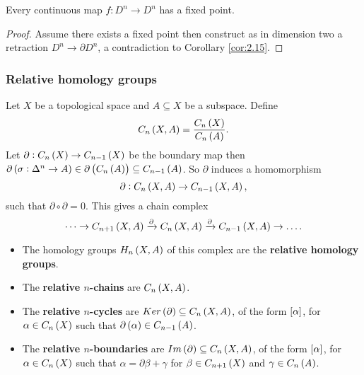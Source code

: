 \begin{theorem}
Every continuous map $ f : D^n \to D^n $ has a fixed point.
\end{theorem}

\begin{proof}
Assume there exists a fixed point then construct as in dimension two a retraction $ D^n \to \partial D^n $, a contradiction to Corollary \ref{cor:2.15}.
\end{proof}

\subsubsection{Relative homology groups}

Let $ X $ be a topological space and $ A \subseteq X $ be a subspace. Define
$$ C_n\br{X, A} = \dfrac{C_n\br{X}}{C_n\br{A}}. $$
Let $ \partial : C_n\br{X} \to C_{n - 1}\br{X} $ be the boundary map then $ \partial\br{\sigma : \Delta^n \to A} \in \partial\br{C_n\br{A}} \subseteq C_{n - 1}\br{A} $. So $ \partial $ induces a homomorphism
$$ \partial : C_n\br{X, A} \to C_{n - 1}\br{X, A}, $$
such that $ \partial \circ \partial = 0 $. This gives a chain complex
$$ \dots \to C_{n + 1}\br{X, A} \xrightarrow{\partial} C_n\br{X, A} \xrightarrow{\partial} C_{n - 1}\br{X, A} \to \dots. $$
\begin{itemize}
\item The homology groups $ H_n\br{X, A} $ of this complex are the \textbf{relative homology groups}.
\item The \textbf{relative $ n $-chains} are $ C_n\br{X, A} $.
\item The \textbf{relative $ n $-cycles} are $ Ker\br{\partial} \subseteq C_n\br{X, A} $, of the form $ \sbr{\alpha} $, for $ \alpha \in C_n\br{X} $ such that $ \partial\br{\alpha} \in C_{n - 1}\br{A} $.
\item The \textbf{relative $ n $-boundaries} are $ Im\br{\partial} \subseteq C_n\br{X, A} $, of the form $ \sbr{\alpha} $, for $ \alpha \in C_n\br{X} $ such that $ \alpha = \partial\beta + \gamma $ for $ \beta \in C_{n + 1}\br{X} $ and $ \gamma \in C_n\br{A} $.
\end{itemize}

\pagebreak


